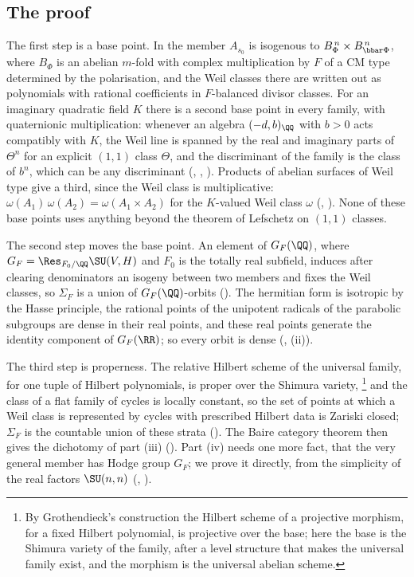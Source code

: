 \subsection{The proof}

The first step is a base point. In  the member $A_{s_{0}}$
is isogenous to $B_{\Phi}^{\,n}\times B_{\bbar\Phi}^{\,n}$, where $B_{\Phi}$ is
an abelian $m$-fold with complex multiplication by $F$ of a CM type determined
by the polarisation, and the Weil classes there are written out as
polynomials with rational coefficients in $F$-balanced divisor classes. For
an imaginary quadratic field $K$ there is a second base point in every family,
with quaternionic multiplication: whenever an algebra $(-d,b)_{\QQ}$ with
$b>0$ acts compatibly with $K$, the Weil line is spanned by the real and
imaginary parts of $\Theta^{n}$ for an explicit $(1,1)$ class $\Theta$, and
the discriminant of the family is the class of $b^{n}$, which can be any
discriminant (, ,
). Products of abelian surfaces of Weil type give a
third, since the Weil class is multiplicative:
$\omega(A_{1})\,\omega(A_{2})=\omega(A_{1}\times A_{2})$ for the
$K$-valued Weil class $\omega$ (, ). None
of these base points uses anything beyond the theorem of Lefschetz on $(1,1)$
classes.

The second step moves the base point. An element of $G_{F}(\QQ)$, where
$G_{F}=\Res_{F_{0}/\QQ}\SU(V,H)$ and $F_{0}$ is the totally real subfield,
induces after clearing denominators an isogeny between two members and fixes
the Weil classes, so $\Sigma_{F}$ is a union of $G_{F}(\QQ)$-orbits
(). The hermitian form is isotropic by the Hasse
principle, the rational points of the unipotent radicals of the parabolic
subgroups are dense in their real points, and these real points generate the
identity component of $G_{F}(\RR)$; so every orbit is dense
(, (ii)).

The third step is properness. The relative Hilbert scheme of the universal
family, for one tuple of Hilbert polynomials, is proper over the Shimura
variety,%
\footnote{By Grothendieck's construction the Hilbert scheme of a projective
morphism, for a fixed Hilbert polynomial, is projective over the base; here
the base is the Shimura variety of the family, after a level structure that
makes the universal family exist, and the morphism is the universal abelian
scheme.}
and the class of a flat family of cycles is locally constant, so the
set of points at which a Weil class is represented by cycles with prescribed
Hilbert data is Zariski closed; $\Sigma_{F}$ is the countable union of these
strata (). The Baire category theorem then gives the
dichotomy of part (iii) (). Part (iv) needs one more
fact, that the very general member has Hodge group $G_{F}$; we prove it
directly, from the simplicity of the real factors $\SU(n,n)$
(, ).

